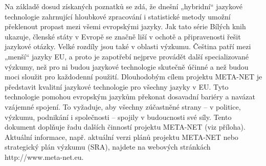 \documentclass[]{../../metanetpaper}
\begin{document}
\begin{multicols}{2}
Na základě dosud získaných poznatků se zdá, že dnešní „hybridní“ jazykové technologie zahrnující hloubkové zpracování i statistické metody umožní překlenout propast mezi všemi evropskými jazyky. Jak tato série Bílých knih ukazuje, členské státy v Evropě se značně liší v ochotě a připravenosti řešit jazykové otázky. Velké rozdíly jsou také v oblasti výzkumu. Čeština patří mezi „menší“ jazyky EU, a proto je zapotřebí nejprve provádět další specializované výzkumy, než pro ni budou jazykové technologie skutečně účinné a než budou moci sloužit pro každodenní použití.
Dlouhodobým cílem projektu META-NET je představit kvalitní jazykové technologie pro všechny jazyky v EU. Tyto technologie pomohou evropským jazykům překonat dosavadní bariéry a navázat vzájemné spojení. To vyžaduje, aby všechny zúčastněné strany – v politice, výzkumu, podnikání i společnosti – spojily v budoucnosti své síly.
Tento dokument doplňuje řadu dalších činností projektu META-NET (viz příloha).
Aktuální informace, např. aktuální verzi plánů projektu META-NET \cite{Meta1} nebo strategický plán výzkumu (SRA), najdete na webových stránkách http://www.meta-net.eu.
\end{multicols}
\clearpage

\end{document}
